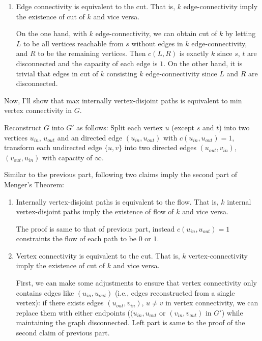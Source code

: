 \documentclass{oxmathproblems}
\begin{document}
\begin{questions}
\begin{Solution}
\begin{enumerate}
    \item Edge connectivity is equivalent to the cut. That is, $k$ edge-connectivity imply the existence of cut of $k$ and vice versa.
    
    On the one hand, with $k$ edge-connectivity, we can obtain cut of $k$ by letting $L$ to be all vertices reachable from $s$ without edges in $k$ edge-connectivity, and $R$ to be the remaining vertices. Then $c(L, R)$ is exactly $k$ since $s$, $t$ are disconnected and the capacity of each edge is $1$. On the other hand, it is trivial that edges in cut of $k$ consisting $k$ edge-connectivity since $L$ and $R$ are disconnected.

    \end{enumerate}

Now, I'll show that max internally vertex-disjoint paths is equivalent to min vertex connectivity in $G$.

Reconstruct $G$ into $G'$ as follows: Split each vertex $u$ (except $s$ and $t$) into two vertices $u_{in}$, $u_{out}$ and an directed edge $(u_{in}, u_{out})$ with $c(u_{in}, u_{out})=1$, transform each undirected edge $\{u, v\}$ into two directed edges $(u_{out}, v_{in})$, $(v_{out}, u_{in})$ with capacity of $\infty$. 

Similar to the previous part, following two claims imply the second part of Menger's Theorem: 

\begin{enumerate}
    \item Internally vertex-disjoint paths is equivalent to the flow. That is, $k$ internal vertex-disjoint paths imply the existence of flow of $k$ and vice versa.
    
    The proof is same to that of previous part, instead $c(u_{in}, u_{out})=1$ constraints the flow of each path to be $0$ or $1$.

    \item Vertex connectivity is equivalent to the cut. That is, $k$ vertex-connectivity imply the existence of cut of $k$ and vice versa.
    
    First, we can make some adjustments to ensure that vertex connectivity only contains edges like $(u_{in}, u_{out})$ (i.e., edges reconstructed from a single vertex): if there exists edges $(u_{out}, v_{in})$, $u\neq v$ in vertex connectivity, we can replace them with either endpoints ($(u_{in}, u_{out}$ or $(v_{in}, v_{out})$ in $G'$) while maintaining the graph disconnected. Left part is same to the proof of the second claim of previous part.
\end{enumerate}
    

\end{Solution}
\end{questions}
\end{document}
